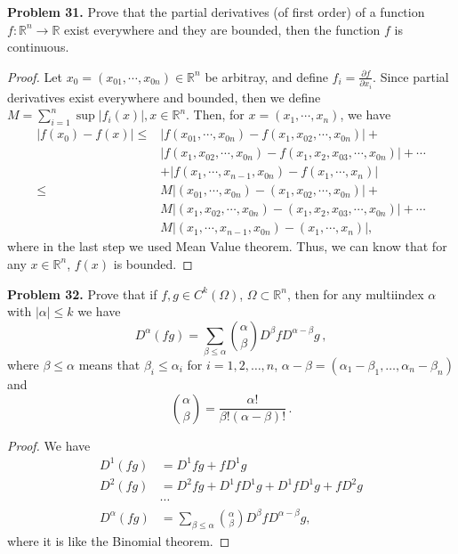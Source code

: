 \documentclass[12pt,leqno]{amsart}
\theoremstyle{definition}
\begin{document}
\noindent
{\bf Problem 31.}
Prove that the partial derivatives (of first order) of a function
$f:\mathbb{R}^n\to\mathbb{R}$ exist everywhere and they are bounded, then
the function $f$ is continuous.
\begin{proof}
Let $x_0 = (x_{01},\cdots,x_{0n}) \in \mathbb{R}^n$ be arbitray, and define $f_i = \frac{\partial f}{\partial x_i}$. Since partial derivatives exist everywhere and bounded, then we define $M = \sum^n_{i=1}\sup |f_i(x)|, x\in \mathbb{R}^n$. Then, for $x = (x_1,\cdots,x_n)$, we have
\begin{align*}
    |f(x_0) - f(x)| \leq & |f(x_{01},\cdots,x_{0n}) - f(x_1, x_{02}, \cdots, x_{0n})| + \\
    & |f(x_1, x_{02}, \cdots, x_{0n}) - f(x_1, x_{2}, x_{03}, \cdots, x_{0n})| + \cdots  \\
    & + |f(x_{1},\cdots, x_{n-1}, x_{0n}) - f(x_1, \cdots, x_n)| \\
    \leq & M |(x_{01},\cdots,x_{0n}) - (x_1, x_{02}, \cdots, x_{0n})| + \\
    & M |(x_1, x_{02}, \cdots, x_{0n}) - (x_1, x_{2}, x_{03}, \cdots, x_{0n})| + \cdots  \\
    & M |(x_{1},\cdots, x_{n-1}, x_{0n}) - (x_1, \cdots, x_n)|,
\end{align*}
where in the last step we used Mean Value theorem. Thus, we can know that for any $x\in \mathbb{R}^n$, $f(x)$ is bounded.
\end{proof}

\medskip

\noindent
{\bf Problem 32.}
Prove that if $f,g\in C^k(\Omega)$, $\Omega\subset\mathbb{R}^n$, then for any multiindex
$\alpha$ with $|\alpha|\leq k$ we have
$$
D^\alpha(fg)=\sum_{\beta\leq \alpha}\binom{\alpha}{\beta}D^\beta f D^{\alpha-\beta}g\, ,
$$
where
$\beta\leq\alpha$ means that $\beta_i\leq\alpha_i$ for $i=1,2,\ldots,n$,
$\alpha-\beta=(\alpha_1-\beta_1,\ldots,\alpha_n-\beta_n)$ and 
$$
\binom{\alpha}{\beta}=\frac{\alpha!}{\beta!(\alpha-\beta)!}\, .
$$
\begin{proof}
We have
\begin{align*}
    D^1(fg) & = D^1f g + f D^1 g \\
    D^2(fg) & = D^2f g + D^1 f D^1 g + D^1 f D^1 g + f D^2 g \\
    & \cdots \\
    D^\alpha(fg) & = \sum_{\beta\leq \alpha}\binom{\alpha}{\beta}D^\beta f D^{\alpha-\beta}g,
\end{align*}
where it is like the Binomial theorem.
\end{proof}
\end{document}
